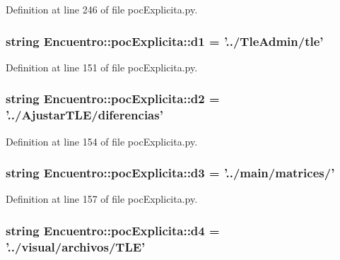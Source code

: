 \-Definition at line 246 of file poc\-Explicita.\-py.

\subsubsection[{d1}]{\setlength{\rightskip}{0pt plus 5cm}string {\bf \-Encuentro\-::poc\-Explicita\-::d1} = '../\-Tle\-Admin/tle'}\label{namespace_encuentro_1_1poc_explicita_ad28b3a43dc771a37740531eee0c0de0e}


\-Definition at line 151 of file poc\-Explicita.\-py.

\subsubsection[{d2}]{\setlength{\rightskip}{0pt plus 5cm}string {\bf \-Encuentro\-::poc\-Explicita\-::d2} = '../\-Ajustar\-T\-L\-E/diferencias'}\label{namespace_encuentro_1_1poc_explicita_a7729370dffef751488eeb7ab37fb3f81}


\-Definition at line 154 of file poc\-Explicita.\-py.

\subsubsection[{d3}]{\setlength{\rightskip}{0pt plus 5cm}string {\bf \-Encuentro\-::poc\-Explicita\-::d3} = '../main/matrices/'}\label{namespace_encuentro_1_1poc_explicita_ab944c29b94ff53ca78ef743b475265bb}


\-Definition at line 157 of file poc\-Explicita.\-py.

\subsubsection[{d4}]{\setlength{\rightskip}{0pt plus 5cm}string {\bf \-Encuentro\-::poc\-Explicita\-::d4} = '../visual/archivos/\-T\-L\-E'}\label{namespace_encuentro_1_1poc_explicita_a5f1affeb758492584226917f70c3ed2d}


